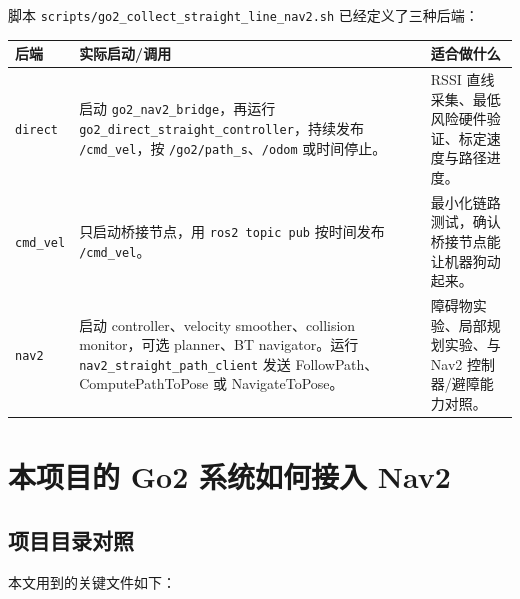 \documentclass[UTF8,11pt,a4paper,openany]{ctexrep}
\newcommand{\code}[1]{\nolinkurl{#1}}
\newcommand{\topic}[1]{\nolinkurl{#1}}
\newcommand{\file}[1]{\nolinkurl{#1}}
\newcommand{\pkg}[1]{\nolinkurl{#1}}
\begin{document}
脚本 \file{scripts/go2_collect_straight_line_nav2.sh} 已经定义了三种后端：

\begin{longtable}{L{0.18\textwidth}L{0.36\textwidth}L{0.36\textwidth}}
\toprule
后端 & 实际启动/调用 & 适合做什么 \\
\midrule
\code{direct} & 启动 \pkg{go2_nav2_bridge}，再运行 \pkg{go2_direct_straight_controller}，持续发布 \topic{/cmd_vel}，按 \topic{/go2/path_s}、\topic{/odom} 或时间停止。 & RSSI 直线采集、最低风险硬件验证、标定速度与路径进度。 \\
\code{cmd_vel} & 只启动桥接节点，用 \code{ros2 topic pub} 按时间发布 \topic{/cmd_vel}。 & 最小化链路测试，确认桥接节点能让机器狗动起来。 \\
\code{nav2} & 启动 controller、velocity smoother、collision monitor，可选 planner、BT navigator。运行 \pkg{nav2_straight_path_client} 发送 FollowPath、ComputePathToPose 或 NavigateToPose。 & 障碍物实验、局部规划实验、与 Nav2 控制器/避障能力对照。 \\
\bottomrule
\end{longtable}

\chapter{本项目的 Go2 系统如何接入 Nav2}
\label{chap:project-wiring}

\section{项目目录对照}

本文用到的关键文件如下：
\end{document}
